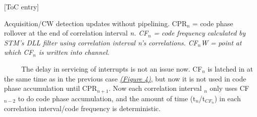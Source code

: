 \documentclass{article}
\begin{document}
\begin{center}
[ToC entry]{\small Acquisition/CW detection updates without pipelining. CPR$_n$ = code phase rollover at the end of correlation interval \it n\normalfont. CF$_n$ = code frequency calculated by STM's DLL filter using correlation interval \it n\normalfont's correlations. CF$_n$W = point at which CF$_n$ is written into channel. \par\ \ \ \ \ The delay in servicing of interrupts is not an issue now. CF$_n$ is latched in at the same time as in the previous case \hyperlink{fig4}{\it(Figure 4)}, but now it is not used in code phase accumulation until CPR$_{n+1}$. Now each correlation interval $_n$ only uses CF$_{n-2}$ to do code phase accumulation, and the amount of time (t$_n$/t$_{CF_n}$) in each correlation interval/code frequency is deterministic.}


\end{center}
\end{document}
